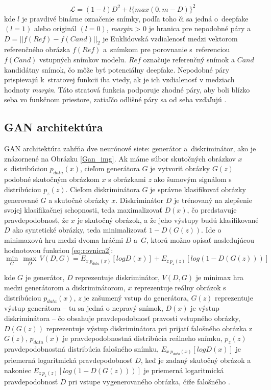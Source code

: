 \begin{equation}
    \mathcal{L} = (1 - l)D^2 + l \{max(0, m - D)\}^2
    \label{eq:rovnica4}
\end{equation}
kde $l$ je pravdivé binárne označenie snímky, podľa toho či sa jedná o~deepfake $(l = 1)$ alebo originál $(l = 0)$, \textit{margin} > 0 je hranica pre nepodobné páry a $D = || f(Ref) - f(Cand)||_2$ je Euklidovská vzdialenosť medzi vektorom referenčného obrázka $f(Ref)$ a~snímkom pre porovnanie s~referenciou $f(Cand)$ vstupných snímkov modelu. $Ref$ označuje referenčný snímok a $Cand$ kandidátny snímok, čo môže byť potenciálny deepfake. Nepodobné páry prispievajú k~stratovej funkcii iba vtedy, ak je ich vzdialenosť v medziach hodnoty \textit{margin}. Táto stratová funkcia podporuje zhodné páry, aby boli blízko seba vo funkčnom priestore, zatiaľčo odlišné páry sa od seba vzďaľujú \cite{7899663}.

\subsection{GAN architektúra}
GAN architektúra zahŕňa dve neurónové siete: generátor a~diskriminátor, ako je znázornené na Obrázku \ref{Gan_img}. Ak máme súbor skutočných obrázkov $x$ s~distribúciou $p_{data}(x)$, cieľom generátora $G$ je vytvoriť obrázky $G(z)$ podobné skutočným obrázkom $x$ s obrázkami $z$ ako šumovým signálom s distribúciou $p_{z}(z)$. Cieľom diskriminátora $G$ je správne klasifikovať obrázky generované $G$ a skutočné obrázky $x$. Diskriminátor $D$ je trénovaný na zlepšenie svojej klasifikačnej schopnosti, teda maximalizovať $D(x)$, čo predstavuje pravdepodobnosť, že $x$ je skutočný obrázok, a že jeho výstupy budú klasifikované $D$ ako syntetické obrázky, teda minimalizovať $1 - D(G(z))$. Ide o minimaxovú hru medzi dvoma hráčmi $D$ a~$G$, ktorú možno opísať nasledujúcou hodnotovou funkciou \ref{eq:rovnica2}:
\begin{equation}
    {\underset{G}{\min}\, \underset{D}{\max}\, V(D,G) = E_{x~p_{data}(x)}[logD(x)]+E_{z~p_{z}(z)}[log(1-D(G(z)))]}
    \label{eq:rovnica2}
\end{equation}

kde $G$ je generátor, $D$ reprezentuje diskriminátor, $V(D,G)$ je minimax hra medzi generátorom a diskriminátorom, $x$ reprezentuje reálny obrázok s distribúciou $p_{data}(x)$, $z$ je zašumený vstup do generátora, $G(z)$ reprezentuje výstup generátora -- tu sa jedná o nepravý snímok, $D(x)$ je výstup diskriminátora -- čo obsahuje pravdepodobnosť pravosti vstupného obrázky, $D(G(z))$ reprezentuje výstup diskriminátora pri prijatí falošného obrázka z $G(z)$, $p_{data}(x)$ je pravdepodobnostná distribúcia reálneho snímku, $p_{z}(z)$ pravdepodobnostná distribúcia falošného snímku, $E_{x~p_{data}(x)}[logD(x)]$ je priemerná logaritmická pravdepodobnosť $D$, keď je zadaný skutočný obrázok a nakoniec $E_{z~p_{z}(z)}[log(1-D(G(z)))]$ je priemerná logaritmická pravdepodobnosť $D$ pri vstupe vygenerovaného obrázka, čiže falošného \cite{gan_eq1, gan_eq2}.

